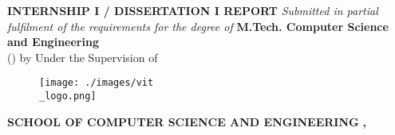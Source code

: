 \addtocounter{page}{-1}
\thispagestyle{empty}
\centering 
\vspace{1cm}
\large{ \textbf{INTERNSHIP I / DISSERTATION I REPORT}} \linebreak
 \linebreak
\normalsize{\textit{Submitted in partial fulfilment of the requirements for the degree of}} \linebreak
\vspace{1em} \linebreak
\large{\textbf{M.Tech. Computer Science and Engineering}}\\(\textbf{\specialization}) \linebreak
\vspace{0.5cm} \linebreak
by \linebreak 
\vspace{0.5em} \linebreak
\Large{\textbf{\studentname}} \linebreak
\large{\textbf{\studentregno}} \linebreak
\vspace{1cm} \linebreak
\normalsize{Under the Supervision of} \linebreak 
\vspace{0.5em} \linebreak
\Large{\textbf{\projsupervisor}} \linebreak 
\normalsize{\projsupervisordesignation} \linebreak
\vspace{2cm}
\begin{figure}[!h]
	\centering
	\texttt{[image: ./images/vit\\\_logo.png]}
\end{figure}
\linebreak \vspace{1cm}
\large{\textbf{SCHOOL OF COMPUTER SCIENCE AND ENGINEERING}} 
\linebreak \vspace{0.5cm}
\textbf{\thesismonth, \thesisyear}
\pagebreak